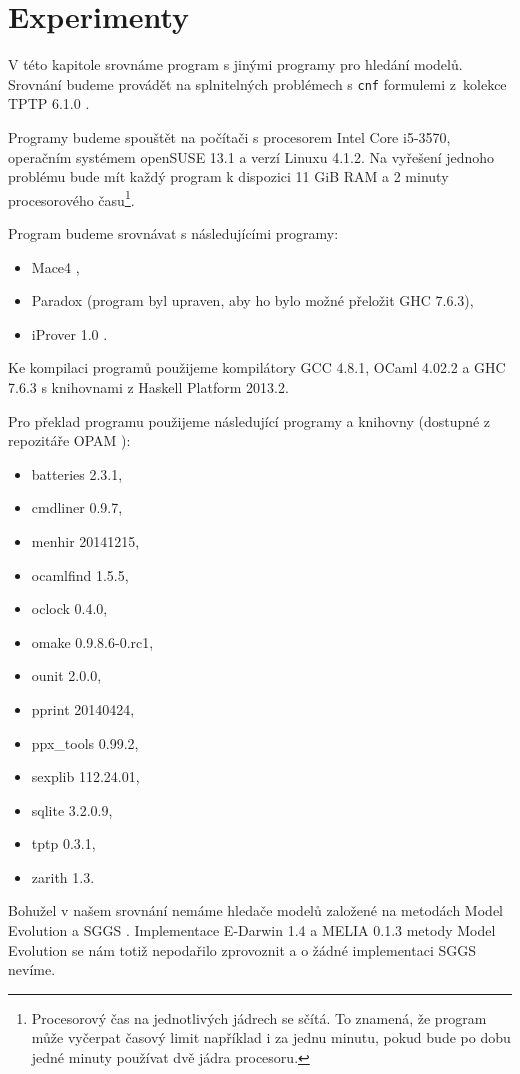 \chapter{Experimenty}

V této kapitole srovnáme program \crossbow{} s jinými programy
pro hledání modelů. Srovnání budeme provádět na splnitelných problémech
s \texttt{cnf} formulemi z~kolekce TPTP 6.1.0 \cite{sutcliffe2009tptp}.

Programy budeme spouštět na počítači s procesorem
Intel Core i5-3570, ope\-račním systémem openSUSE 13.1 a
verzí Linuxu 4.1.2. Na vyřešení jednoho problému bude mít
každý program k dispozici 11 GiB RAM a 2 minuty procesorového
času\footnote{Procesorový čas na jednotlivých jádrech se sčítá. To
znamená, že program může vyčerpat časový limit například i za jednu minutu,
pokud bude po dobu jedné minuty používat dvě jádra procesoru.}.

Program \crossbow{} budeme srovnávat s následujícími programy:
\begin{itemize}
\item Mace4 \cite{mccune03mace4},
\item Paradox \cite{paradox} (program byl upraven,
  aby ho bylo možné přeložit GHC 7.6.3),
\item iProver 1.0 \cite{iprover}.
\end{itemize}
Ke kompilaci programů použijeme kompilátory GCC 4.8.1,
OCaml 4.02.2 a GHC 7.6.3 s knihovnami z Haskell Platform 2013.2.

Pro překlad programu \crossbow{} použijeme následující programy
a knihovny (dostupné z repozitáře OPAM \cite{opam}):
\begin{itemize}
\item batteries 2.3.1,
\item cmdliner 0.9.7,
\item menhir 20141215,
\item ocamlfind 1.5.5,
\item oclock 0.4.0,
\item omake 0.9.8.6-0.rc1,
\item ounit 2.0.0,
\item pprint 20140424,
\item ppx\_tools 0.99.2,
\item sexplib 112.24.01,
\item sqlite 3.2.0.9,
\item tptp 0.3.1,
\item zarith 1.3.
\end{itemize}

Bohužel v našem srovnání nemáme hledače modelů
založené na metodách Model Evolution
a SGGS \cite{bonacina2015}.
Implementace E-Darwin 1.4 \cite{edarwin} a MELIA 0.1.3 \cite{melia}
metody Model Evolution se nám totiž nepodařilo zprovoznit
a o žádné implementaci SGGS nevíme.
